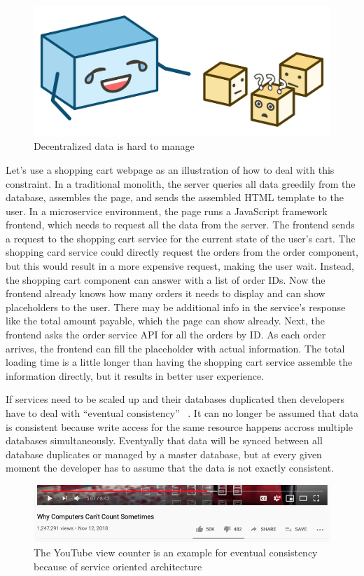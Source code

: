 \begin{figure}[ht]
  \centering
  \includegraphics[width=0.55\linewidth]{assets/illustration-decentralized-data.png}
  \caption{Decentralized data is hard to manage}
\end{figure}

Let's use a shopping cart webpage as an illustration of how to deal with this constraint. In a traditional monolith, the server queries all data greedily from the database, assembles the page, and sends the assembled HTML template to the user. In a microservice environment, the page runs a JavaScript framework frontend, which needs to request all the data from the server. The frontend sends a request to the shopping cart service for the current state of the user's cart. The shopping card service could directly request the orders from the order component, but this would result in a more expensive request, making the user wait. Instead, the shopping cart component can answer with a list of order IDs. Now the frontend already knows how many orders it needs to display and can show placeholders to the user. There may be additional info in the service's response like the total amount payable, which the page can show already. Next, the frontend asks the order service API for all the orders by ID. As each order arrives, the frontend can fill the placeholder with actual information. The total loading time is a little longer than having the shopping cart service assemble the information directly, but it results in better user experience.

If services need to be scaled up and their databases duplicated then developers have to deal with ``eventual consistency'' ~\cite{fowler.2015}. It can no longer be assumed that data is consistent because write access for the same resource happens accross multiple databases simultaneously. Eventyally that data will be synced between all database duplicates or managed by a master database, but at every given moment the developer has to assume that the data is not exactly consistent.

\begin{figure}[ht]
  \centering
  \includegraphics[width=0.70\linewidth]{assets/youtube-view-counter.png}
  \caption[The YouTube view counter as an example for eventual consistency]{The YouTube view counter is an example for eventual consistency because of service oriented architecture}
\end{figure}

